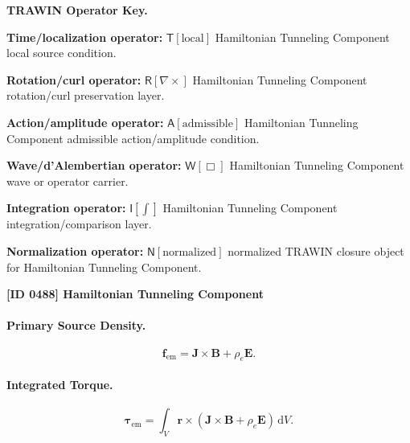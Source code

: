 \par\vspace{0.45\baselineskip}
\noindent\begin{minipage}[t]{\linewidth}
\begingroup
\small
\raggedright
\textbf{TRAWIN Operator Key.}\par
\noindent\textbf{Time/localization operator:} $\mathsf{T}\!\left[\mathrm{local}\right]$ Hamiltonian Tunneling Component local source condition.\par
\noindent\textbf{Rotation/curl operator:} $\mathsf{R}\!\left[\nabla\times\right]$ Hamiltonian Tunneling Component rotation/curl preservation layer.\par
\noindent\textbf{Action/amplitude operator:} $\mathsf{A}\!\left[\mathrm{admissible}\right]$ Hamiltonian Tunneling Component admissible action/amplitude condition.\par
\noindent\textbf{Wave/d'Alembertian operator:} $\mathsf{W}\!\left[\Box\right]$ Hamiltonian Tunneling Component wave or operator carrier.\par
\noindent\textbf{Integration operator:} $\mathsf{I}\!\left[\int\right]$ Hamiltonian Tunneling Component integration/comparison layer.\par
\noindent\textbf{Normalization operator:} $\mathsf{N}\!\left[\mathrm{normalized}\right]$ normalized TRAWIN closure object for Hamiltonian Tunneling Component.\par
\endgroup
\end{minipage}

\clearpage
\noindent\textbf{[ID 0488] Hamiltonian Tunneling Component}\par
\vspace{0.35em}
\paragraph{Primary Source Density.}
\begin{equation}
\mathbf{f}_{\mathrm{em}}
=
\mathbf{J}\times\mathbf{B}
+
\rho_e\mathbf{E}.
\end{equation}

\paragraph{Integrated Torque.}
\begin{equation}
\boldsymbol{\tau}_{\mathrm{em}}
=
\int_V
\mathbf{r}\times
\left(
\mathbf{J}\times\mathbf{B}
+
\rho_e\mathbf{E}
\right)
\,\mathrm{d}V .
\end{equation}

